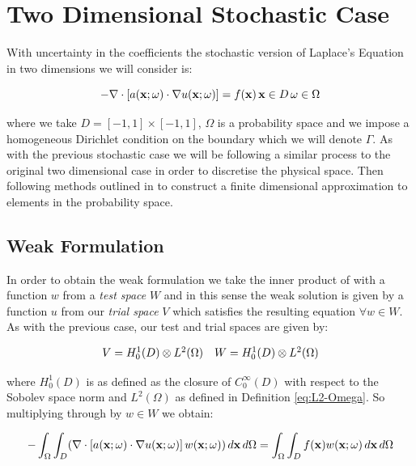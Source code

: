\chapter{Two Dimensional Stochastic Case}\label{chap:twod-stochastic}

With uncertainty in the coefficients the stochastic version of Laplace's
Equation in two dimensions we will consider is:

\begin{equation}\label{eq:twod-stochastic}
      -\nabla\cdot\left[a(\mathbf{x};\omega)\cdot\nabla u(\mathbf{x};\omega) \right]
      = f(\mathbf{x})\, \mathbf{x} \in D \, \omega \in \Omega
\end{equation}

where we take $D = [-1, 1] \times [-1, 1]$, $\Omega$ is a probability space and
we impose a homogeneous Dirichlet condition on the boundary which we will
denote $\Gamma$. As with the previous stochastic case we will be following a
similar process to the original two dimensional case in order to discretise the
physical space. Then following methods outlined in \cite{general-poly-chaos} to
construct a finite dimensional approximation to elements in the probability
space.

\section{Weak Formulation}

In order to obtain the weak formulation we take the inner product of
 with a function $w$ from a \textit{test space} $W$
and in this sense the weak solution is given by a function $u$ from our
\textit{trial space} $V$ which satisfies the resulting equation $\forall w \in
W$. As with the previous case, our test and trial spaces are given by:

\begin{equation}
    \begin{array}{c c}
        V = H^1_0(D) \otimes L^2(\Omega) &
        W = H^1_0(D) \otimes L^2(\Omega)
    \end{array}
\end{equation}

where $H^1_0(D)$ is as defined as the closure of $C_0^\infty(D)$ with respect
to the Sobolev space norm  and $L^2(\Omega)$ as defined
in Definition \ref{eq:L2-Omega}. So multiplying through by $w \in W$ we obtain:

\begin{equation}
    -\int_{\Omega}\int_D(\nabla\cdot\left[
        a(\mathbf{x};\omega)\cdot\nabla u(\mathbf{x};\omega)\right]
    w(\mathbf{x};\omega))\, d\mathbf{x}\, d\Omega =
        \int_{\Omega}\int_Df(\mathbf{x})w(\mathbf{x};\omega)\, d\mathbf{x}\, d\Omega
\end{equation}

